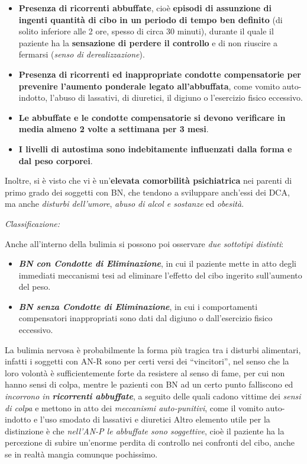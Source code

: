 \documentclass[]{article}
\begin{document}
\begin{itemize}
\item
  \textbf{Presenza di ricorrenti abbuffate}, cioè \textbf{episodi di
  assunzione di ingenti quantità di cibo in un periodo di tempo ben
  definito} (di solito inferiore alle 2 ore, spesso di circa 30 minuti),
  durante il quale il paziente ha la \textbf{sensazione di perdere il
  controllo} e di non riuscire a fermarsi (\emph{senso di
  derealizzazione}).
\item
  \textbf{Presenza di ricorrenti ed inappropriate condotte compensatorie
  per prevenire l'aumento ponderale legato all'abbuffata}, come vomito
  auto-indotto, l'abuso di lassativi, di diuretici, il digiuno o
  l'esercizio fisico eccessivo.
\item
  \textbf{Le abbuffate e le condotte compensatorie si devono verificare
  in media almeno 2 volte a settimana per 3 mesi}.
\item
  \textbf{I livelli di autostima sono indebitamente influenzati dalla
  forma e dal peso corporei}.
\end{itemize}

Inoltre, si è visto che vi è un'\textbf{elevata comorbilità
psichiatrica} nei parenti di primo grado dei soggetti con BN, che
tendono a sviluppare anch'essi dei DCA, ma anche \emph{disturbi
dell'umore}, \emph{abuso di alcol e sostanze} ed \emph{obesità}.

\emph{\emph{Classificazione:}}

Anche all'interno della bulimia si possono poi osservare \emph{due
sottotipi distinti}:

\begin{itemize}
\item
  \textbf{\emph{BN con Condotte di Eliminazione}}, in cui il paziente
  mette in atto degli immediati meccanismi tesi ad eliminare l'effetto
  del cibo ingerito sull'aumento del peso.
\item
  \textbf{\emph{BN senza Condotte di Eliminazione}}, in cui i
  comportamenti compensatori inappropriati sono dati dal digiuno o
  dall'esercizio fisico eccessivo.
\end{itemize}

La bulimia nervosa è probabilmente la forma più tragica tra i disturbi
alimentari, infatti i soggetti con AN-R sono per certi versi dei
``vincitori'', nel senso che la loro volontà è sufficientemente forte da
resistere al senso di fame, per cui non hanno sensi di colpa, mentre le
pazienti con BN ad un certo punto falliscono ed \emph{incorrono in
\textbf{ricorrenti abbuffate}}, a seguito delle quali cadono vittime dei
\emph{sensi di colpa} e mettono in atto dei \emph{meccanismi
auto-punitivi}, come il vomito auto-indotto e l'uso smodato di lassativi
e diuretici Altro elemento utile per la distinzione è che
\emph{nell'AN-P le abbuffate sono soggettive}, cioè il paziente ha la
percezione di subire un'enorme perdita di controllo nei confronti del
cibo, anche se in realtà mangia comunque pochissimo.
\end{document}
